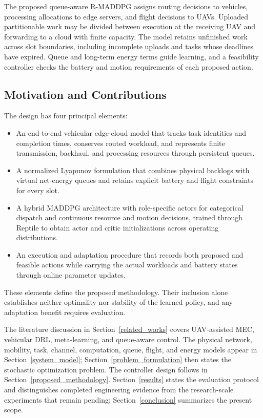 \documentclass[journal]{IEEEtran}
\begin{document}
The proposed queue-aware R-MADDPG assigns routing decisions to vehicles, processing allocations to edge servers, and flight decisions to UAVs. Uploaded partitionable work may be divided between execution at the receiving UAV and forwarding to a cloud with finite capacity. The model retains unfinished work across slot boundaries, including incomplete uploads and tasks whose deadlines have expired. Queue and long-term energy terms guide learning, and a feasibility controller checks the battery and motion requirements of each proposed action.

\subsection{Motivation and Contributions}
The design has four principal elements:
\begin{itemize}
\item An end-to-end vehicular edge-cloud model that tracks task identities and completion times, conserves routed workload, and represents finite transmission, backhaul, and processing resources through persistent queues.
\item A normalized Lyapunov formulation that combines physical backlogs with virtual net-energy queues and retains explicit battery and flight constraints for every slot.
\item A hybrid MADDPG architecture with role-specific actors for categorical dispatch and continuous resource and motion decisions, trained through Reptile to obtain actor and critic initializations across operating distributions.
\item An execution and adaptation procedure that records both proposed and feasible actions while carrying the actual workloads and battery states through online parameter updates.
\end{itemize}
These elements define the proposed methodology. Their inclusion alone establishes neither optimality nor stability of the learned policy, and any adaptation benefit requires evaluation.

The literature discussion in Section~\ref{related_works} covers UAV-assisted MEC, vehicular DRL, meta-learning, and queue-aware control. The physical network, mobility, task, channel, computation, queue, flight, and energy models appear in Section~\ref{system_model}; Section~\ref{problem_formulation} then states the stochastic optimization problem. The controller design follows in Section~\ref{proposed_methodology}. Section~\ref{results} states the evaluation protocol and distinguishes completed engineering evidence from the research-scale experiments that remain pending; Section~\ref{conclusion} summarizes the present scope.
\end{document}
